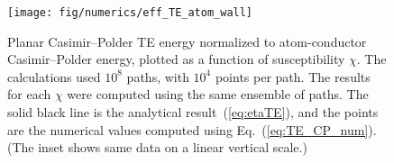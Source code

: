\begin{figure}
  \centering
 \texttt{[image: fig/numerics/eff\_TE\_atom\_wall]}
  \caption[Planar Casimir--Polder TE energy as function of $\chi$]
  {Planar Casimir--Polder TE energy normalized to atom-conductor Casimir--Polder energy, plotted as a function of susceptibility $\chi$.  
    The calculations used $10^8$ paths, with $10^4$ points per path.
    The results for each $\chi$ were computed using the same ensemble of paths.
    The solid black line is the analytical result~(\ref{eq:etaTE}), and the points are the numerical
    values computed using Eq.~(\ref{eq:TE_CP_num}).  
    (The inset shows same data on a linear vertical scale.)
    }
  \label{fig:eff_TE_atom_wall}
\end{figure}



